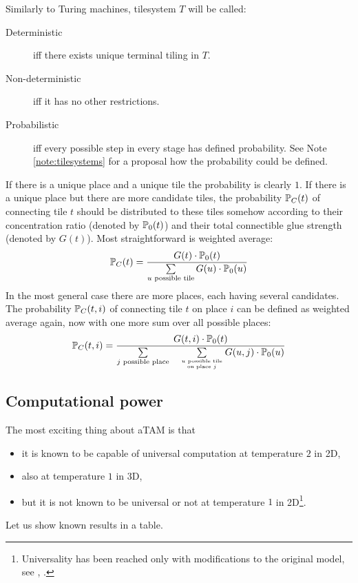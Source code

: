 	Similarly to Turing machines, tilesystem $T$ will be called:
	\begin{description}
		\item[Deterministic] iff there exists unique terminal tiling in $T$. %
		\item[Non-deterministic] iff it has no other restrictions. %
		\item[Probabilistic] iff every possible step in every stage has defined probability. See Note \ref{note:tilesystems} for a proposal how the probability could be defined.
	\end{description}
	
	\begin{note}\label{note:tilesystems}
		If there is a unique place and a unique tile the probability is clearly $1$. If there is a unique place but there are more candidate tiles, the probability $\mathbb{P}_C(t)$ of connecting tile $t$ should be distributed to these tiles somehow according to their concentration ratio (denoted by $\mathbb{P}_0(t)$) and their total connectible glue strength (denoted by $G(t)$). Most straightforward is weighted average:
		\begin{equation*}
			\mathbb{P}_C(t) = \frac{G(t)\cdot\mathbb{P}_0(t)}{\sum\limits_{u\textnormal{ possible tile}}G(u)\cdot\mathbb{P}_0(u)}
		\end{equation*}
		In the most general case there are more places, each having several candidates. The probability $\mathbb{P}_C(t,i)$ of connecting tile $t$ on place $i$ can be defined as weighted average again, now with one more sum over all possible places:
		\begin{equation*}
			\mathbb{P}_C(t,i) = \frac{G(t,i)\cdot\mathbb{P}_0(t)}{\sum\limits_{j\textnormal{ possible place}}\quad\sum\limits_{u\textnormal{ possible tile}\atop\textnormal{on place }j}G(u,j)\cdot\mathbb{P}_0(u)}
		\end{equation*}
	\end{note}

\subsection{Computational power}\label{sec:wang_power}
	
	The most exciting thing about aTAM is that
	\begin{itemize}
		\item it is known to be capable of universal computation at temperature $2$ in 2D,
		\item also at temperature $1$ in 3D,
		\item but it is not known to be universal or not at temperature $1$ in 2D\footnote{Universality has been reached only with modifications to the original model, see \cite{stage_assembly}, \cite{active_tiles}.}.
	\end{itemize}
	Let us show known results in a table.
	
